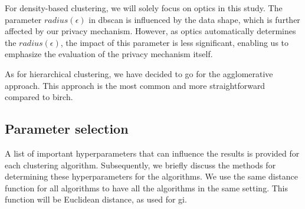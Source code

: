 For density-based clustering, we will solely focus on \gls{optics} in this study.
The parameter $radius (\epsilon)$ in \gls{dbscan} is influenced by the data shape, which is further affected by our privacy mechanism.
However, as \gls{optics} automatically determines the $radius(\epsilon)$, the impact of this parameter is less significant, enabling us to emphasize the evaluation of the privacy mechanism itself.

As for hierarchical clustering, we have decided to go for the agglomerative approach.
This approach is the most common and more straightforward compared to \gls{birch}.


\subsection{Parameter selection}
A list of important hyperparameters that can influence the results is provided for each clustering algorithm.
Subsequently, we briefly discuss the methods for determining these hyperparameters for the algorithms. \newline
We use the same distance function for all algorithms to have all the algorithms in the same setting.
This function will be Euclidean distance, as used for \gls{gi}.
